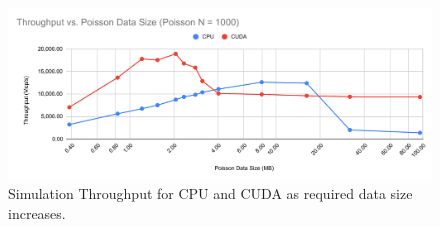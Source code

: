 \begin{figure}
    \centering
    \includegraphics[width=\linewidth]{Ch62Results/figures/temp_throughput_over_size.pdf}
    \caption{Simulation Throughput for CPU and CUDA as required data size increases.}
    \label{fig:results:throughput_over_size}
\end{figure}